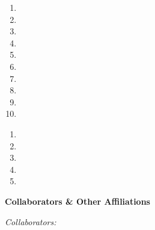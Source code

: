 \begin{enumerate}
\item

\item

\item

\item

\item

\item

\item

\item

\item

\item
\end{enumerate}


\begin{enumerate}
\item

\item

\item

\item

\item
\end{enumerate}

\vspace{12pt}
{\bf Collaborators \& Other Affiliations}

\vspace{12pt}
\emph{Collaborators:}

